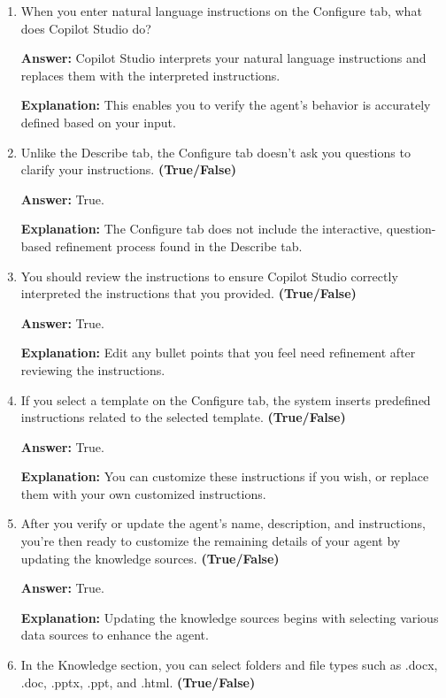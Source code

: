 \documentclass[10pt]{article}
\begin{document}
\begin{enumerate}[leftmargin=*]
\textbf{Explanation:} You can enter your instructions using natural language on the Configure tab.

\item When you enter natural language instructions on the Configure tab, what does Copilot Studio do?

\textbf{Answer:} Copilot Studio interprets your natural language instructions and replaces them with the interpreted instructions.

\textbf{Explanation:} This enables you to verify the agent's behavior is accurately defined based on your input.

\item Unlike the Describe tab, the Configure tab doesn’t ask you questions to clarify your instructions. \textbf{(True/False)}

\textbf{Answer:} True.

\textbf{Explanation:} The Configure tab does not include the interactive, question-based refinement process found in the Describe tab.

\item You should review the instructions to ensure Copilot Studio correctly interpreted the instructions that you provided. \textbf{(True/False)}

\textbf{Answer:} True.

\textbf{Explanation:} Edit any bullet points that you feel need refinement after reviewing the instructions.

\item If you select a template on the Configure tab, the system inserts predefined instructions related to the selected template. \textbf{(True/False)}

\textbf{Answer:} True.

\textbf{Explanation:} You can customize these instructions if you wish, or replace them with your own customized instructions.

\item After you verify or update the agent’s name, description, and instructions, you’re then ready to customize the remaining details of your agent by updating the knowledge sources. \textbf{(True/False)}

\textbf{Answer:} True.

\textbf{Explanation:} Updating the knowledge sources begins with selecting various data sources to enhance the agent.

\item In the Knowledge section, you can select folders and file types such as .docx, .doc, .pptx, .ppt, and .html. \textbf{(True/False)}


\end{enumerate}
\end{document}
